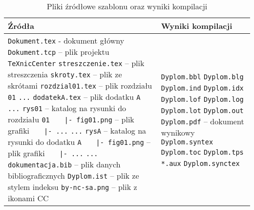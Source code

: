 \begin{table}[htb]
\centering\small
\caption{Pliki źródłowe szablonu oraz wyniki kompilacji}
\label{tab:szablon}
\begin{tabularx}{\linewidth}{|p{.55\linewidth}|X|}\hline
Źródła & Wyniki kompilacji \\ \hline\hline
\verb?Dokument.tex? - dokument główny\newline
\verb?Dokument.tcp? -- plik projektu \verb+TeXnicCenter+\newline
\verb?streszczenie.tex? -- plik streszczenia\newline
\verb?skroty.tex? -- plik ze skrótami\newline
\verb?rozdzial01.tex? -- plik rozdziału \texttt{01}\newline
\verb?...?\newline
\verb?dodatekA.tex? -- plik dodatku \texttt{A}\newline
\verb?...?\newline
\verb?rys01? -- katalog na rysunki do rozdziału \texttt{01}\newline
\verb?   |- fig01.png? -- plik grafiki\newline
\verb?   |- ...?\newline
\verb?...?\newline
\verb?rysA? -- katalog na rysunki do dodatku \texttt{A}\newline
\verb?   |- fig01.png? -- plik grafiki\newline
\verb?   |- ...?\newline
\verb?...?\newline
\verb?dokumentacja.bib? -- plik danych bibliograficznych\newline
\verb?Dyplom.ist? -- plik ze stylem indeksu\newline
\verb?by-nc-sa.png? -- plik z ikonami CC\newline
 &
\verb?Dyplom.bbl?\newline
\verb?Dyplom.blg?\newline
\verb?Dyplom.ind?\newline
\verb?Dyplom.idx?\newline
\verb?Dyplom.lof?\newline
\verb?Dyplom.log?\newline
\verb?Dyplom.lot?\newline
\verb?Dyplom.out?\newline
\verb?Dyplom.pdf? -- dokument wynikowy\newline
\verb?Dyplom.syntex?\newline
\verb?Dyplom.toc?\newline
\verb?Dyplom.tps?\newline
\verb?*.aux?\newline 
\verb?Dyplom.synctex?\newline\\
\hline
\end{tabularx}
\end{table}

